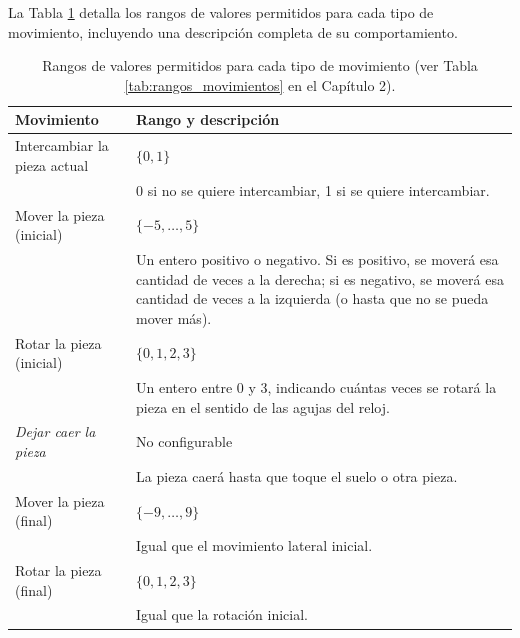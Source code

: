 \documentclass[11pt,spanish,listoffigures,listoftables]{tfgetsinf}
\begin{document}
La Tabla \ref{tab:rangos_movimientos_appendix} detalla los rangos de valores permitidos para cada tipo de movimiento, incluyendo una descripción completa de su comportamiento.

\begin{table}[H]
    \centering
    \begin{tabular}{lp{8cm}}
        \toprule
        \textbf{Movimiento} & \textbf{Rango y descripción} \\
        \midrule
        Intercambiar la pieza actual & $\{0, 1\}$ \\ 
        & 0 si no se quiere intercambiar, 1 si se quiere intercambiar. \\
        \midrule
        Mover la pieza (inicial) & $\{-5, \dots, 5\}$ \\ 
        & Un entero positivo o negativo. Si es positivo, se moverá esa cantidad de veces a la derecha; si es negativo, se moverá esa cantidad de veces a la izquierda (o hasta que no se pueda mover más). \\
        \midrule
        Rotar la pieza (inicial) & $\{0, 1, 2, 3\}$ \\ 
        & Un entero entre 0 y 3, indicando cuántas veces se rotará la pieza en el sentido de las agujas del reloj. \\
        \midrule
        \textit{Dejar caer la pieza} & No configurable \\ 
        & La pieza caerá hasta que toque el suelo o otra pieza. \\
        \midrule
        Mover la pieza (final) & $\{-9, \dots, 9\}$ \\ 
        & Igual que el movimiento lateral inicial. \\
        \midrule
        Rotar la pieza (final) & $\{0, 1, 2, 3\}$ \\ 
        & Igual que la rotación inicial. \\
        \bottomrule
    \end{tabular}
    \caption{Rangos de valores permitidos para cada tipo de movimiento (ver Tabla \ref{tab:rangos_movimientos} en el Capítulo 2).}
    \label{tab:rangos_movimientos_appendix}

\end{table}



\end{document}
